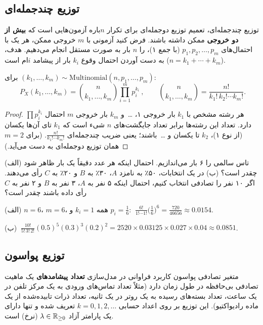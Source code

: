 \subsection{توزیع چندجمله‌ای }
توزیع چندجمله‌ای، تعمیم توزیع دوجمله‌ای برای تکرار $n$باره آزمون‌هایی است که \textbf{بیش از دو خروجی} ممکن داشته باشند. فرض کنید آزمونی با $m$ خروجی ممکن، هر یک با احتمال‌های $p_1,p_2,\ldots,p_m$ (با جمع ۱)، را $n$ بار به صورت مستقل انجام می‌دهیم. هدف، به دست آوردن احتمال وقوع $k_i$ بار از پیشامد $i$ام است ($n=k_1+\cdots+k_m$).

\begin{theorem}
برای $(k_1,\ldots,k_m)\sim\mathrm{Multinomial}(n,p_1,\ldots,p_m)$:
\[
\boxed{\ P_X(k_1,\ldots,k_m)=\binom{n}{k_1,\ldots,k_m}\prod_{i=1}^{m}p_i^{k_i}\ },\qquad
\binom{n}{k_1,\ldots,k_m}=\frac{n!}{k_1!\,k_2!\cdots k_m!}.
\]
\end{theorem}
\begin{proof}
هر رشته مشخص با $k_1$ بار خروجی ۱، \ldots\ و $k_m$ بار خروجی $m$ احتمال $\prod p_i^{k_i}$ دارد. تعداد این رشته‌ها برابر تعداد جایگشت‌های $n$ شیء است که $k_1$ تای آن‌ها یکسان (از نوع ۱)، $k_2$ تا یکسان و \ldots\ باشند؛ یعنی ضریب چندجمله‌ای $\frac{n!}{k_1!\cdots k_m!}$. (برای $m=2$ همان توزیع دوجمله‌ای به دست می‌آید.)
\end{proof}

\begin{example}
(الف) تاس سالمی را ۶ بار می‌اندازیم. احتمال اینکه هر عدد دقیقاً یک بار ظاهر شود چقدر است؟
(ب) در یک انتخابات، ۵۰٪ به نامزد $A$، ۳۰٪ به $B$ و ۲۰٪ به $C$ رأی می‌دهند. اگر ۱۰ نفر را تصادفی انتخاب کنیم، احتمال اینکه ۵ نفر به $A$، ۳ نفر به $B$ و ۲ نفر به $C$ رأی داده باشند چقدر است؟
\begin{solution}
(الف) $n=6$، $m=6$، همه $k_i=1$ و $p_i=\frac16$:
$\ \frac{6!}{1!\cdots1!}\big(\frac16\big)^6=\frac{720}{46656}\approx0.0154$.

(ب) $\ \frac{10!}{5!\,3!\,2!}(0.5)^5(0.3)^3(0.2)^2=2520\times0.03125\times0.027\times0.04\approx0.0851$.
\end{solution}
\end{example}

\subsection{توزیع پواسون }
متغیر تصادفی پواسون کاربرد فراوانی در مدل‌سازی \textbf{تعداد پیشامدهای} یک ماهیت تصادفی بی‌حافظه در طول زمان دارد (مثلاً تعداد تماس‌های ورودی به یک مرکز تلفن در یک ساعت، تعداد بسته‌های رسیده به یک روتر در یک ثانیه، تعداد ذرات تابیده‌شده از یک ماده رادیواکتیو). این توزیع بر روی اعداد حسابی $k=0,1,2,\ldots$ تعریف شده و تنها دارای یک پارامتر آزاد $\lambda\in\mathbb{R}_{\ge0}$ (نرخ) است.

